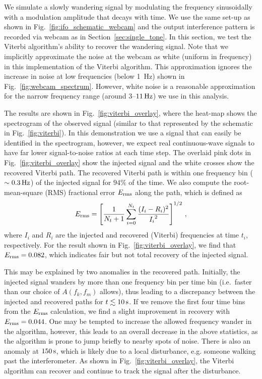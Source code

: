 \documentclass[paper-main.tex]{subfiles}
\begin{document}
We simulate a slowly wandering signal by modulating the frequency sinusoidally with a modulation amplitude that decays with time. 
We use the same set-up as shown in Fig.~\ref{fig:ifo_schematic_webcam} and the output interference pattern is recorded via webcam as in Section~\ref{sec:single_tone}. 
In this section, we test the Viterbi algorithm’s ability to recover the wandering signal. 
Note that we implicitly approximate the noise at the webcam as white (uniform in frequency) in this implementation of the Viterbi algorithm. 
This approximation ignores the increase in noise at low frequencies (below 1~Hz) shown in Fig.~\ref{fig:webcam_spectrum}.
However, white noise is a reasonable approximation for the narrow frequency range (around $3$--$11\,{\rm Hz}$) we use in this analysis. 



The results are shown in Fig.~\ref{fig:viterbi_overlay}, where the heat-map shows the spectrogram of the observed signal (similar to that represented by the schematic in Fig.~\ref{fig:viterbi}). 
In this demonstration we use a signal that can easily be identified in the spectrogram, however, we expect real continuous-wave signals to have far lower signal-to-noise ratios at each time step. 
The overlaid pink dots in Fig.~\ref{fig:viterbi_overlay} show the injected signal and the white crosses show the recovered Viterbi path.
The recovered Viterbi path is within one frequency bin ($\sim 0.3\,{\rm Hz}$) of the injected signal for $94\%$ of the time. We also compute the root-mean-square (RMS) fractional error $E_{\rm rms}$ along the path, which is defined as 
\begin{equation}
E_{\rm rms} = \left[ \frac{1}{N_t+1} \sum_{i=0}^{N_t} \frac{(I_i - R_i)^2}{{I_i}^2} \right] ^{1/2}\,,
\end{equation}
where $I_i$ and $R_i$ are the injected and recovered (Viterbi) frequencies at time $t_i$, respectively. 
For the result shown in Fig.~\ref{fig:viterbi_overlay}, we find that $E_{\rm rms} = 0.082$, which indicates fair but not total recovery of the injected signal.



This may be explained by two anomalies in the recovered path. Initially, the injected signal wanders by more than one frequency bin per time bin (i.e.\ faster than our choice of $A(f_k,f_m)$ allows), thus leading to a discrepancy between the injected and recovered paths for $t\lesssim 10\,{\rm s}$. 
If we remove the first four time bins from the $E_{\rm rms}$ calculation, we find a slight improvement in recovery with $E_{\rm rms} = 0.044$.
One may be tempted to increase the allowed frequency wander in the algorithm, however, this leads to an overall decrease in the above statistics, as the algorithm is prone to jump briefly to nearby spots of noise. 
There is also an anomaly at $150\,{\rm s}$, which is likely due to a local disturbance, e.g. someone walking past the interferometer. 
As shown in Fig.~\ref{fig:viterbi_overlay}, the Viterbi algorithm can recover and continue to track the signal after the disturbance. 
\end{document}
